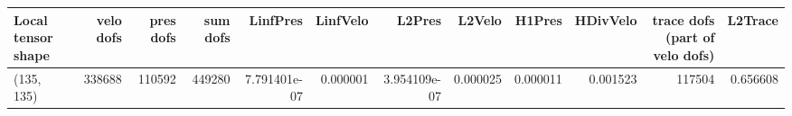 \begin{tabular}{lrrrrrrrrrrr}
\toprule
Local tensor shape &  velo dofs &  pres dofs &  sum dofs &     LinfPres &  LinfVelo &       L2Pres &   L2Velo &   H1Pres &  HDivVelo &  trace dofs (part of velo dofs) &  L2Trace \\
\midrule
        (135, 135) &     338688 &     110592 &    449280 & 7.791401e-07 &  0.000001 & 3.954109e-07 & 0.000025 & 0.000011 &  0.001523 &                          117504 & 0.656608 \\
\bottomrule
\end{tabular}
